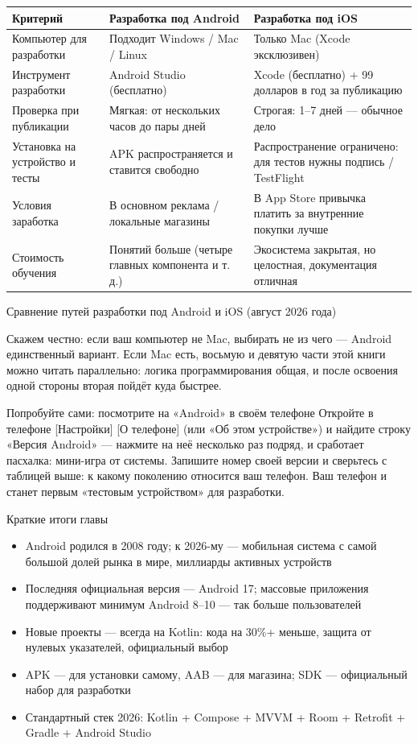 \begin{center}
\begin{tabularx}{\linewidth}{|X|X|X|}
\hline
\textbf{Критерий} & \textbf{Разработка под Android} & \textbf{Разработка под iOS} \tabularnewline
\hline
Компьютер для разработки & Подходит Windows / Mac / Linux & Только Mac (Xcode эксклюзивен) \tabularnewline
Инструмент разработки & Android Studio (бесплатно) & Xcode (бесплатно) + 99 долларов в год за публикацию \tabularnewline
Проверка при публикации & Мягкая: от нескольких часов до пары дней & Строгая: 1–7 дней — обычное дело \tabularnewline
Установка на устройство и тесты & APK распространяется и ставится свободно & Распространение ограничено: для тестов нужны подпись / TestFlight \tabularnewline
Условия заработка & В основном реклама / локальные магазины & В App Store привычка платить за внутренние покупки лучше \tabularnewline
Стоимость обучения & Понятий больше (четыре главных компонента и т. д.) & Экосистема закрытая, но целостная, документация отличная \tabularnewline
\hline
\end{tabularx}
\end{center}

\begin{center}\small\color{gray}Сравнение путей разработки под Android и iOS (август 2026 года)\end{center}

Скажем честно: если ваш компьютер не Mac, выбирать не из чего — Android единственный вариант. Если Mac есть, восьмую и девятую части этой книги можно читать параллельно: логика программирования общая, и после освоения одной стороны вторая пойдёт куда быстрее.

\begin{tcbpractice}{Попробуйте сами: посмотрите на «Android» в своём телефоне}
Откройте в телефоне [Настройки] [О телефоне] (или «Об этом устройстве») и найдите строку «Версия Android» — нажмите на неё несколько раз подряд, и сработает пасхалка: мини-игра от системы. Запишите номер своей версии и сверьтесь с таблицей выше: к какому поколению относится ваш телефон. Ваш телефон и станет первым «тестовым устройством» для разработки.

\end{tcbpractice}

\begin{tcbsummary}{Краткие итоги главы}
\begin{itemize}
  \item Android родился в 2008 году; к 2026-му — мобильная система с самой большой долей рынка в мире, миллиарды активных устройств
  \item Последняя официальная версия — Android 17; массовые приложения поддерживают минимум Android 8–10 — так больше пользователей
  \item Новые проекты — всегда на Kotlin: кода на 30\%+ меньше, защита от нулевых указателей, официальный выбор
  \item APK — для установки самому, AAB — для магазина; SDK — официальный набор для разработки
  \item Стандартный стек 2026: Kotlin + Compose + MVVM + Room + Retrofit + Gradle + Android Studio
\end{itemize}

\end{tcbsummary}
